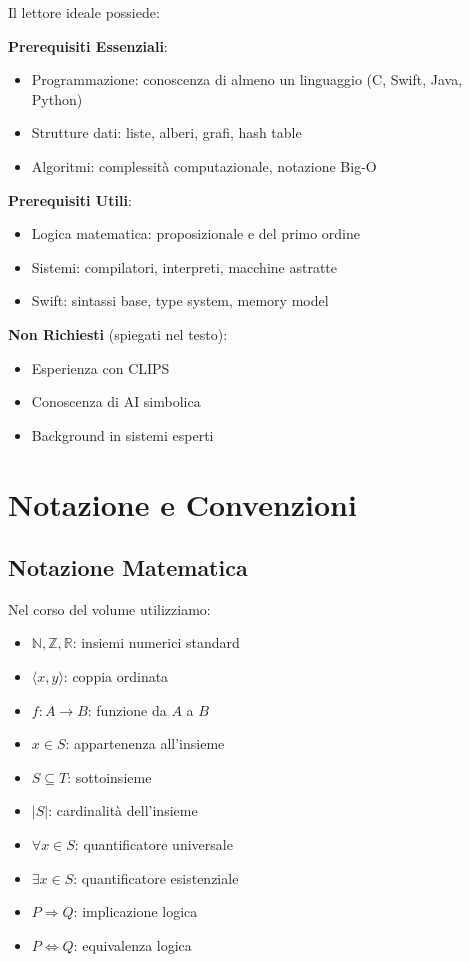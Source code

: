 Il lettore ideale possiede:

\textbf{Prerequisiti Essenziali}:
\begin{itemize}
\item Programmazione: conoscenza di almeno un linguaggio (C, Swift, Java, Python)
\item Strutture dati: liste, alberi, grafi, hash table
\item Algoritmi: complessità computazionale, notazione Big-O
\end{itemize}

\textbf{Prerequisiti Utili}:
\begin{itemize}
\item Logica matematica: proposizionale e del primo ordine
\item Sistemi: compilatori, interpreti, macchine astratte
\item Swift: sintassi base, type system, memory model
\end{itemize}

\textbf{Non Richiesti} (spiegati nel testo):
\begin{itemize}
\item Esperienza con CLIPS
\item Conoscenza di AI simbolica
\item Background in sistemi esperti
\end{itemize}

\section{Notazione e Convenzioni}

\subsection{Notazione Matematica}

Nel corso del volume utilizziamo:

\begin{itemize}
\item $\mathbb{N}, \mathbb{Z}, \mathbb{R}$: insiemi numerici standard
\item $\langle x, y \rangle$: coppia ordinata
\item $f: A \to B$: funzione da $A$ a $B$
\item $x \in S$: appartenenza all'insieme
\item $S \subseteq T$: sottoinsieme
\item $|S|$: cardinalità dell'insieme
\item $\forall x \in S$: quantificatore universale
\item $\exists x \in S$: quantificatore esistenziale
\item $P \Rightarrow Q$: implicazione logica
\item $P \Leftrightarrow Q$: equivalenza logica
\end{itemize}

